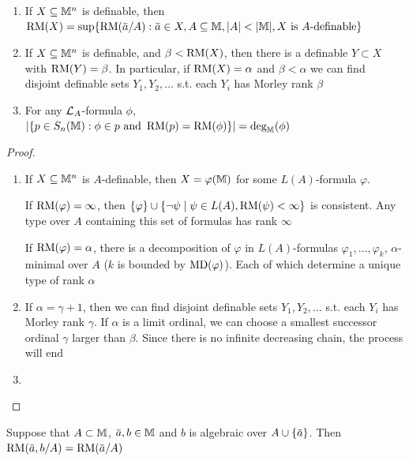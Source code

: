 \documentclass[11pt]{article}
\begin{document}
\begin{lemma}[]
\label{Problem11}
\label{lemma6.2.16}
\begin{enumerate}
\item If \(X\subseteq\mathbb{M}^n\) is definable,
then \(\RM(X)=\sup\{\RM(\bara/A):\bara\in X,A\subseteq\M,\abs{A}<\abs{\M},X\text{ is }A\text{-definable}\}\)
\item If \(X\subseteq\mathbb{M}^n\) is definable, and \(\beta<\operatorname{RM}(X)\), then there is a definable \(Y\subset X\)
with \(\operatorname{RM}(Y)=\beta\). In particular, if \(\operatorname{RM}(X)=\alpha\) and \(\beta<\alpha\) we can find disjoint definable
sets \(Y_1,Y_2,\dots\) s.t. each \(Y_i\) has Morley rank \(\beta\)
\item For any \(\mathcal{L}_A\)-formula \(\phi\), \(\abs{\{p\in S_n(\M):\phi\in p\text{ and }\RM(p)=\RM(\phi)\}}=\deg_{\M}(\phi)\)
\end{enumerate}
\end{lemma}


\begin{proof}
\begin{enumerate}
\item If \(X\subseteq\mathbb{M}^n\) is \(A\)-definable, then \(X=\varphi(\mathbb{M})\) for some \(L(A)\)-formula \(\varphi\).

If \(\operatorname{RM}(\varphi)=\infty\), then \(\{\varphi\}\cup\{\neg\psi\mid\psi\in L(A),\operatorname{RM}(\psi)<\infty\}\) is consistent. Any type over \(A\)
containing this set of formulas has rank \(\infty\)

If \(\operatorname{RM}(\varphi)=\alpha\), there is a decomposition of \(\varphi\) in \(L(A)\)-formulas \(\varphi_1,\dots,\varphi_k\), \(\alpha\)-minimal
over \(A\) (\(k\) is bounded by \(\operatorname{MD}(\varphi)\)). Each of which determine a unique type of rank \(\alpha\)

\item If \(\alpha=\gamma+1\), then we can find disjoint definable sets \(Y_1,Y_2,\dots\) s.t. each \(Y_i\) has
Morley rank \(\gamma\). If \(\alpha\) is a limit ordinal, we can choose a smallest successor ordinal \(\gamma\) larger
than \(\beta\). Since there is no infinite decreasing chain, the process will end

\item 
\end{enumerate}
\end{proof}

\begin{lemma}[]
\label{lemma6.2.17}
Suppose that \(A\subset\mathbb{M}\), \(\bara,b\in\M\) and \(b\) is algebraic over \(A\cup\{\bara\}\). Then \(\RM(\bara,b/A)=\RM(\bara/A)\)
\end{lemma}
\end{document}
